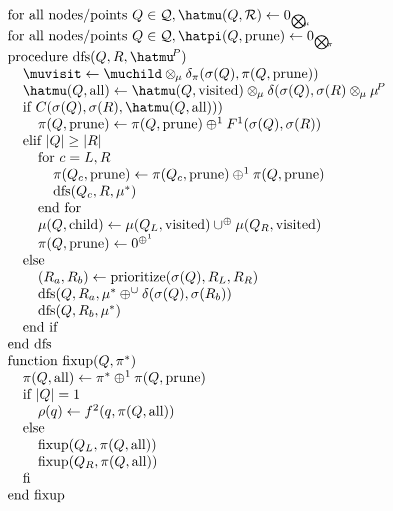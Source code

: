 \documentclass[times, 10pt,twocolumn]{article}
\newcommand{\union}{\cup}
\DeclareMathOperator{\dfs}{dfs}
\DeclareMathOperator{\child}{child}
\DeclareMathOperator{\all}{all}
\DeclareMathOperator{\visited}{visited}
\DeclareMathOperator{\prune}{prune}
\newcommand{\muv}{\union^{\oplus}}
\newcommand{\muh}{\oplus^{\union}}
\newcommand{\wholeR}{\mathcal{R}}
\newcommand{\wholeQ}{\mathcal{Q}}
\newcommand{\x}{\hspace{0.15in}}
\newcommand{\xx}{\hspace{0.3in}}
\newcommand{\xxx}{\hspace{0.45in}}
\newcommand{\kdparent}{\hspace{-0.02in}^P}
\newcommand{\myOp}[1]{\mathop{\bigotimes\nolimits\hspace{-0.045in}_{#1}}}
\newcommand{\myop}[1]{\otimes\hspace{-0.04in}_{#1}\hspace{0.03in}}
\newcommand{\Oppi}{\myOp{\pi}}
\newcommand{\deltapi}{\delta_{\pi}}
\newcommand{\allrho}{\rho}
\newcommand{\Opmu}{\myOp{\mu}}
\newcommand{\opmu}{\myop{\mu}}
\newcommand{\allsigma}{\sigma}
\begin{document}
\begin{equation*}
  \begin{array}{l}
    \text{for all nodes/points } Q \in \wholeQ, \hatmu(Q, \wholeR) \gets 0_{\Opmu}
    \\
    \text{for all nodes/points } Q \in \wholeQ, \hatpi(Q, \prune) \gets 0_{\Oppi}
    \\
    \mbox{procedure dfs}(Q, R, \hatmu\kdparent)
    \\
    \x \muvisit \gets \muchild \opmu \deltapi(\allsigma(Q), \pi(Q, \prune))
    \\
    \x \hatmu(Q, \all) \gets \hatmu(Q, \visited) \opmu \delta(\allsigma(Q), \allsigma(R) \opmu \mu\kdparent
    \\
    \x \mbox{if } C(\allsigma(Q), \allsigma(R), \hatmu(Q, \all)))
    \\
    \xx \pi(Q, \prune) \gets \pi(Q, \prune) \oplus^{1} F^{1}(\allsigma(Q), \allsigma(R))
    \\
    \x \mbox{elif } |Q| \geq |R|
    \\
    \xx \mbox{for } c = L, R
    \\
    \xxx \pi(Q_c, \prune) \gets \pi(Q_c, \prune) \oplus^{1} \pi(Q, \prune)
    \\
    \xxx \mbox{dfs}(Q_c, R, \mu^{*})
    \\
    \xx \mbox{end for}
    \\
    \xx \mu(Q, \child) \gets \mu(Q_L, \visited) \muv \mu(Q_R, \visited)
    \\
    \xx \pi(Q, \prune) \gets 0^{\oplus^{1}}
    \\
    \x \mbox{else}
    \\
    \xx (R_a, R_b) \gets \mbox{prioritize}(\allsigma(Q), R_L, R_R)
    \\
    \xx \dfs(Q, R_a, \mu^{*} \muh \delta(\allsigma(Q), \allsigma(R_b))
    \\
    \xx \dfs(Q, R_b, \mu^{*})
    \\
    \x \mbox{end if}
    \\
    \mbox{end dfs}
    \\
    \mbox{function fixup}(Q, \pi^{*})
    \\
    \x \pi(Q, \all) \gets \pi^{*} \oplus^{1} \pi(Q, \prune)
    \\
    \x \mbox{if } |Q| = 1
    \\
    \xx \allrho(q) \gets f^{2}(q, \pi(Q, \all))
    \\
    \x \mbox{else}
    \\
    \xx \mbox{fixup}(Q_L, \pi(Q, \all))
    \\
    \xx \mbox{fixup}(Q_R, \pi(Q, \all))
    \\
    \x \mbox{fi}
    \\
    \mbox{end fixup}
  \end{array}
\end{equation*}
\end{document}
